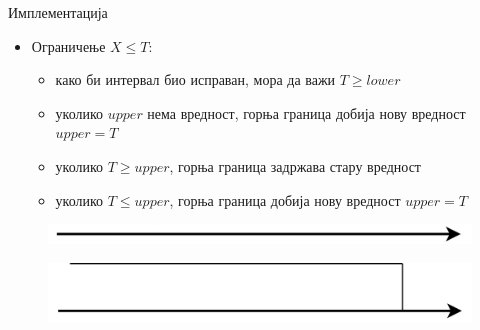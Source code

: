 \documentclass[xcolor=table]{beamer}
\begin{document}
\begin{frame}[allowframebreaks]{Имплементација}
        \begin{itemize}
            \item Ограничење \begin{math}X \leq T\end{math}:
            \begin{itemize}
                \item како би интервал био исправан, мора да важи \begin{math}T \geq lower\end{math}
                \item уколико \begin{math}upper\end{math} нема вредност, горња граница добија нову вредност \begin{math}upper = T\end{math}
                \item уколико \begin{math}T \geq upper\end{math}, горња граница задржава стару вредност
                \item уколико \begin{math}T \leq upper\end{math}, горња граница добија нову вредност \begin{math}upper = T\end{math}
            \end{itemize}
        \end{itemize}
        
        \framebreak
        
        \begin{figure}
            \centering
            \includegraphics[width=\textwidth,height=0.8\textheight,keepaspectratio]{images/uni_int0.png}
        \end{figure}
        
        \framebreak
        
        \begin{figure}
            \centering
            \includegraphics[width=\textwidth,height=0.8\textheight,keepaspectratio]{images/uni_int11.png}
        \end{figure}
        

\end{frame}
\end{document}
